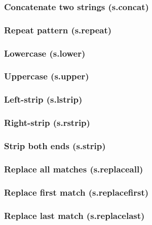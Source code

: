 \documentclass{article}
\theoremstyle{definition}
\begin{document}
\subsubsection{Concatenate two strings (s.concat)}

\subsubsection{Repeat pattern (s.repeat)}

\subsubsection{Lowercase (s.lower)}

\subsubsection{Uppercase (s.upper)}

\subsubsection{Left-strip (s.lstrip)}

\subsubsection{Right-strip (s.rstrip)}

\subsubsection{Strip both ends (s.strip)}

\subsubsection{Replace all matches (s.replaceall)}

\subsubsection{Replace first match (s.replacefirst)}

\subsubsection{Replace last match (s.replacelast)}
\end{document}
